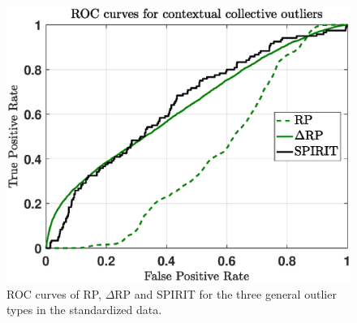 \begin{figure}[h]
\begin{minipage}{0.333\textwidth}
		\includegraphics[scale=0.28]{analysis/ROCs_collective_scaled}
	\end{minipage}
	\caption{ROC curves of RP, $\Delta$RP and SPIRIT for the three general outlier types in the standardized data.}
	\label{fig:analysis_rocs_point_scaled}
\end{figure}



